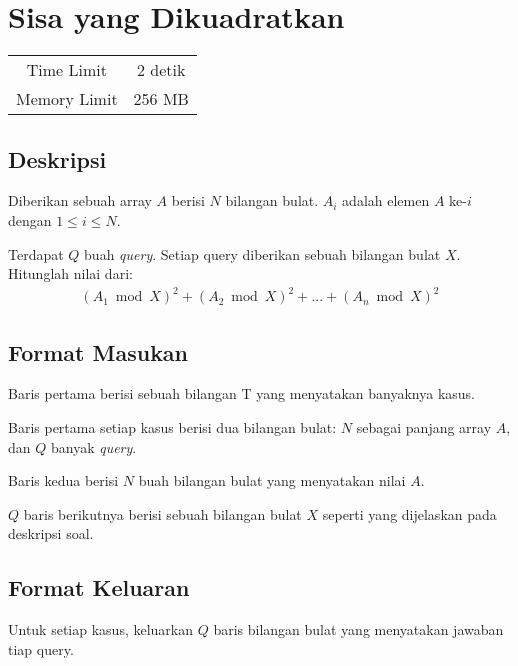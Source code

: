\documentclass{article}
\begin{document}
\section*{\hfil Sisa yang Dikuadratkan\hfil}

\begin{center}
\begin{tabular}{ |cc| } 
 \hline
 Time Limit & 2 detik \\ 
 Memory Limit & 256 MB \\
 \hline
\end{tabular}
\end{center}

\subsection*{Deskripsi}

\par Diberikan sebuah array $A$ berisi $N$ bilangan bulat. $A_{i}$ adalah elemen $A$ ke-$i$ dengan $1 \leq i \leq N$.

\par Terdapat $Q$ buah \textit{query}. Setiap query diberikan sebuah bilangan bulat $X$. Hitunglah nilai dari:
\begin{gather*} 
(A_{1} \bmod X)^2 + (A_{2} \bmod X)^2 + ... + (A_{n} \bmod X)^2
\end{gather*} 

\subsection*{Format Masukan}
\par Baris pertama berisi sebuah bilangan T yang menyatakan banyaknya kasus.
\par Baris pertama setiap kasus berisi dua bilangan bulat: $N$ sebagai panjang array $A$, dan $Q$ banyak \textit{query}.
\par Baris kedua berisi $N$ buah bilangan bulat yang menyatakan nilai $A$.
\par $Q$ baris berikutnya berisi sebuah bilangan bulat $X$ seperti yang dijelaskan pada deskripsi soal.

\subsection*{Format Keluaran}

\par Untuk setiap kasus, keluarkan $Q$ baris bilangan bulat yang menyatakan jawaban tiap query.
\end{document}
